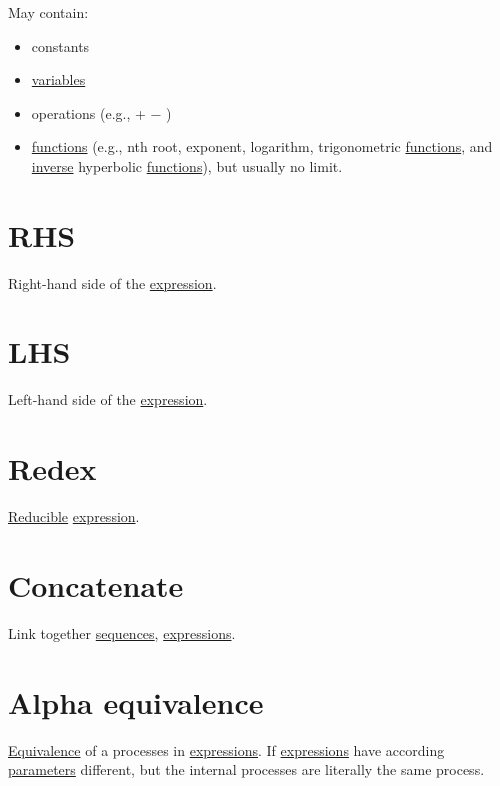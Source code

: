 \documentclass[a4paper,14pt,oneside]{book}
\begin{document}
May contain:\\
\begin{itemize}
\item constants\\
\item \hyperref[org0f938c0]{variables}\\
\item operations (e.g., + − \texttimes{} \textdiv{})\\
\item \hyperref[org788d18f]{functions} (e.g., nth root, exponent, logarithm, trigonometric \hyperref[org788d18f]{functions}, and \hyperref[orgeb3638a]{inverse} hyperbolic \hyperref[org788d18f]{functions}), but usually no limit.\\
\end{itemize}

\section{\label{orgf302029}RHS}
\label{sec:org87f959c}
Right-hand side of the \hyperref[orgade06d7]{expression}.\\

\section{\label{org2b7fa96}LHS}
\label{sec:org935cc7e}
Left-hand side of the \hyperref[orgade06d7]{expression}.\\

\section{\label{org7dc3ab0}Redex}
\label{sec:org7e50330}
\hyperref[orgfa27a3e]{Reducible} \hyperref[orgade06d7]{expression}.\\

\section{\label{orgbac5ff2}Concatenate}
\label{sec:org8c5e179}
Link together \hyperref[org647b286]{sequences}, \hyperref[org907bfe3]{expressions}.\\

\section{\label{orgaa79781}Alpha equivalence}
\label{sec:org1621798}
\hyperref[org884f16c]{Equivalence} of a processes in \hyperref[org907bfe3]{expressions}. If \hyperref[org907bfe3]{expressions} have according \hyperref[org4c72d7e]{parameters} different, but the internal processes are literally the same process.\\
\end{document}
